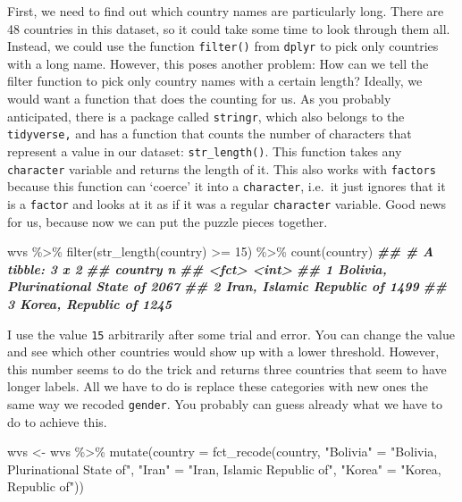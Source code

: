 \documentclass[
]{book}
\newenvironment{Shaded}{\begin{snugshade}}{\end{snugshade}}
\newcommand{\AttributeTok}[1]{\textcolor[rgb]{0.77,0.63,0.00}{#1}}
\newcommand{\DecValTok}[1]{\textcolor[rgb]{0.00,0.00,0.81}{#1}}
\newcommand{\DocumentationTok}[1]{\textcolor[rgb]{0.56,0.35,0.01}{\textbf{\textit{#1}}}}
\newcommand{\FunctionTok}[1]{\textcolor[rgb]{0.00,0.00,0.00}{#1}}
\newcommand{\NormalTok}[1]{#1}
\newcommand{\OtherTok}[1]{\textcolor[rgb]{0.56,0.35,0.01}{#1}}
\newcommand{\SpecialCharTok}[1]{\textcolor[rgb]{0.00,0.00,0.00}{#1}}
\newcommand{\StringTok}[1]{\textcolor[rgb]{0.31,0.60,0.02}{#1}}
\begin{document}
First, we need to find out which country names are particularly long. There are 48 countries in this dataset, so it could take some time to look through them all. Instead, we could use the function \texttt{filter()} from \texttt{dplyr} to pick only countries with a long name. However, this poses another problem: How can we tell the filter function to pick only country names with a certain length? Ideally, we would want a function that does the counting for us. As you probably anticipated, there is a package called \texttt{stringr}, which also belongs to the \texttt{tidyverse,} and has a function that counts the number of characters that represent a value in our dataset: \texttt{str\_length()}. This function takes any \texttt{character} variable and returns the length of it. This also works with \texttt{factors} because this function can `coerce' it into a \texttt{character}, i.e.~it just ignores that it is a \texttt{factor} and looks at it as if it was a regular \texttt{character} variable. Good news for us, because now we can put the puzzle pieces together.

\begin{Shaded}
\begin{Highlighting}[]
\NormalTok{wvs }\SpecialCharTok{\%\textgreater{}\%}
  \FunctionTok{filter}\NormalTok{(}\FunctionTok{str\_length}\NormalTok{(country) }\SpecialCharTok{\textgreater{}=} \DecValTok{15}\NormalTok{) }\SpecialCharTok{\%\textgreater{}\%} 
  \FunctionTok{count}\NormalTok{(country)}
\DocumentationTok{\#\# \# A tibble: 3 x 2}
\DocumentationTok{\#\#   country                             n}
\DocumentationTok{\#\#   \textless{}fct\textgreater{}                           \textless{}int\textgreater{}}
\DocumentationTok{\#\# 1 Bolivia, Plurinational State of  2067}
\DocumentationTok{\#\# 2 Iran, Islamic Republic of        1499}
\DocumentationTok{\#\# 3 Korea, Republic of               1245}
\end{Highlighting}
\end{Shaded}

I use the value \texttt{15} arbitrarily after some trial and error. You can change the value and see which other countries would show up with a lower threshold. However, this number seems to do the trick and returns three countries that seem to have longer labels. All we have to do is replace these categories with new ones the same way we recoded \texttt{gender}. You probably can guess already what we have to do to achieve this.

\begin{Shaded}
\begin{Highlighting}[]
\NormalTok{wvs }\OtherTok{\textless{}{-}}\NormalTok{ wvs }\SpecialCharTok{\%\textgreater{}\%}
  \FunctionTok{mutate}\NormalTok{(}\AttributeTok{country =} \FunctionTok{fct\_recode}\NormalTok{(country,}
                                   \StringTok{"Bolivia"} \OtherTok{=} \StringTok{"Bolivia, Plurinational State of"}\NormalTok{,}
                                   \StringTok{"Iran"} \OtherTok{=} \StringTok{"Iran, Islamic Republic of"}\NormalTok{,}
                                   \StringTok{"Korea"} \OtherTok{=} \StringTok{"Korea, Republic of"}\NormalTok{))}
\end{Highlighting}
\end{Shaded}
\end{document}
